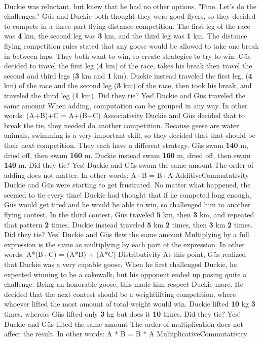 \documentclass[a4paper,11pt ]{book}
\begin{document}
\paragraph{} Duckie was reluctant, but knew that he had no other options. "Fine. Let's do the challenges."
\pagebreak
{Güs and Duckie both thought they were good flyers, so they decided to compete in a three-part flying distance competition. The first leg of the race was \textbf{4} km, the second leg was \textbf{3} km, and the third leg was \textbf{1} km. The distance flying competition rules stated that any goose would be allowed to take one break in between laps. They both want to win, so create strategies to try to win. Güs decided to travel the first leg (\textbf{4} km) of the race, takes his break then travel the second and third legs (\textbf{3} km and \textbf{1} km). Duckie instead traveled the first leg, (\textbf{4} km) of the race and the second leg (\textbf{3} km) of the race, then took his break, and traveled the third leg (\textbf{1} km). Did they tie?}
{Yes! Duckie and Güs traveled the same amount}
{When adding, computation can be grouped in any way. In other words: (A+B)+C = A+(B+C)}
{Associativity}
{Duckie and Güs decided that to break the tie, they needed do another competition. \linebreak Because geese are water animals, swimming is a very important skill, so they decided that that should be their next competition. They each have a different strategy. Güs swam \textbf{140} m, dried off, then swam \textbf{160} m. Duckie instead swam \textbf{160} m, dried off, then swam \textbf{140} m. Did they tie?}
{Yes! Duckie and Güs swam the same amount}
{The order of adding does not matter. In other words: A+B = B+A}
{AdditiveCommutativity}
{Duckie and Güs were starting to get frustrated. No matter what happened, the seemed to tie every time! Duckie had thought that if he competed long enough, Güs would get tired and he would be able to win, so challenged him to another flying contest. In the third contest, Güs traveled \textbf{5} km, then \textbf{3} km, and repeated that pattern \textbf{2} times. Duckie instead traveled \textbf{5} km \textbf{2} times, then \textbf{3} km \textbf{2} times. Did they tie?}
{Yes! Duckie and Güs flew the same amount}
{Multiplying by a full expression is the same as multiplying by each part of the expression. In other words: A*(B+C) = (A*B) + (A*C)}
{Distributivity}
{At this point, Güs realized that Duckie was a very capable goose. When he first challenged Duckie, he expected winning to be a cakewalk, but his opponent ended up posing quite a challenge. Being an honorable goose, this made him respect Duckie more. He decided that the next contest should be a weightlifting competition, where whoever lifted the most amount of total weight would win. Duckie lifted \textbf{10} kg \textbf{3} times, whereas Güs lifted only \textbf{3} kg but does it \textbf{10} times. Did they tie?}
{Yes! Duckie and Güs lifted the same amount}
{The order of multiplication does not affect the result. In other words: A * B = B * A}
{MultiplicativeCommutativity}
\end{document}
